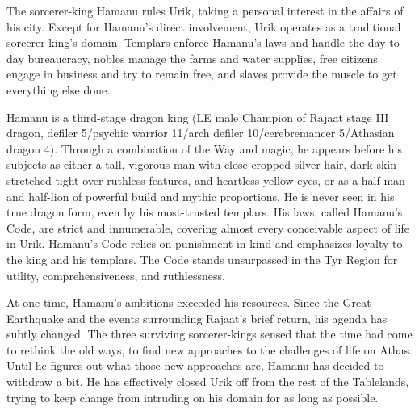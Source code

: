 {
	The sorcerer-king Hamanu rules Urik, taking a personal interest in the affairs of his city. Except for Hamanu's direct involvement, Urik operates as a traditional sorcerer-king's domain. Templars enforce Hamanu's laws and handle the day-to-day bureaucracy, nobles manage the farms and water supplies, free citizens engage in business and try to remain free, and slaves provide the muscle to get everything else done.

	Hamanu is a third-stage dragon king (LE male Champion of Rajaat stage III dragon, defiler 5/psychic warrior 11/arch defiler 10/cerebremancer 5/Athasian dragon 4). Through a combination of the Way and magic, he appears before his subjects as either a tall, vigorous man with close-cropped silver hair, dark skin stretched tight over ruthless features, and heartless yellow eyes, or as a half-man and half-lion of powerful build and mythic proportions. He is never seen in his true dragon form, even by his most-trusted templars. His laws, called Hamanu's Code, are strict and innumerable, covering almost every conceivable aspect of life in Urik. Hamanu's Code relies on punishment in kind and emphasizes loyalty to the king and his templars. The Code stands unsurpassed in the Tyr Region for utility, comprehensiveness, and ruthlessness.

	At one time, Hamanu's ambitions exceeded his resources. Since the Great Earthquake and the events surrounding Rajaat's brief return, his agenda has subtly changed. The three surviving sorcerer-kings sensed that the time had come to rethink the old ways, to find new approaches to the challenges of life on Athas. Until he figures out what those new approaches are, Hamanu has decided to withdraw a bit. He has effectively closed Urik off from the rest of the Tablelands, trying to keep change from intruding on his domain for as long as possible.
}
